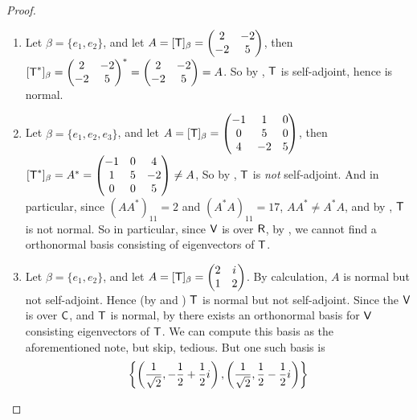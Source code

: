 \begin{proof} \ 

\begin{enumerate}
\item Let \(\beta = \{ e_1, e_2 \}\), and let  \(A = [\textsf{T}]_{\beta} = \begin{pmatrix}2 & -2 \\ -2 & 5\end{pmatrix}\),
then \([\textsf{T}^*]_{\beta} = \begin{pmatrix}2 & -2 \\ -2 & 5\end{pmatrix}^* = \begin{pmatrix}2 & -2 \\ -2 & 5\end{pmatrix} = A\).
So by , \(\textsf{T}\) is self-adjoint, hence is normal.

\item Let  \(\beta = \{ e_1, e_2, e_3 \}\), and let \(A = [\textsf{T}]_{\beta} = \begin{pmatrix}-1 & 1 & 0 \\ 0 & 5 & 0 \\ 4 & -2 & 5\end{pmatrix}\), then \([\textsf{T}^*]_{\beta} = A^{*} = \begin{pmatrix}-1 & 0 & 4 \\ 1 & 5 & -2 \\ 0 & 0 & 5\end{pmatrix} \neq A\), So by , \(\textsf{T}\) is \emph{not} self-adjoint.
And in particular, since \((A A^*)_{11} = 2\) and \((A^* A)_{11} = 17\), \(A A^* \ne A^*A\), and by , \(\textsf{T}\) is not normal.
So in particular, since \(\textsf{V}\) is over \(\textsf{R}\), by , we cannot find a orthonormal basis consisting of eigenvectors of \(\textsf{T}\).

\item Let \(\beta = \{ e_1, e_2 \}\), and let \(A = [\textsf{T}]_{\beta} = \begin{pmatrix} 2 & {i\mkern1mu} \\ 1 & 2 \end{pmatrix}\).
By calculation, \(A\) is normal but not self-adjoint.
Hence (by  and ) \(\textsf{T}\) is normal but not self-adjoint.
Since the \(\textsf{V}\) is over \(\textsf{C}\), and \(\textsf{T}\) is normal, by  there exists an orthonormal basis for \(\textsf{V}\) consisting eigenvectors of \(\textsf{T}\).
We can compute this basis as the aforementioned note, but skip, tedious.
But one such basis is
\[
    \left\{ \left( \frac{1}{\sqrt{2}}, -\frac{1}{2} + \frac{1}{2}{i\mkern1mu} \right), \left( \frac{1}{\sqrt{2}}, \frac{1}{2} - \frac{1}{2}{i\mkern1mu} \right) \right\}
\]


\end{enumerate}
\end{proof}
